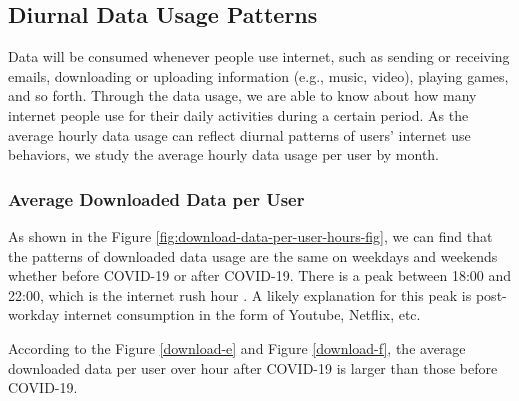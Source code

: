 \subsection{Diurnal Data Usage Patterns}
Data will be consumed whenever people use internet, such as sending or receiving emails, downloading or uploading information (e.g., music, video), playing games, and so forth.
Through the data usage, we are able to know about how many internet people use for their daily activities during a certain period. As the average hourly data usage can reflect diurnal patterns of users’ internet use behaviors, we study the average hourly data usage per user by month. 


\subsubsection{Average Downloaded Data per User}
\label{sec:download-data-per-user-over-hours}


As shown in the Figure \ref{fig:download-data-per-user-hours-fig}, we can find that the patterns of downloaded data usage are the same on weekdays and weekends whether before COVID-19 or after COVID-19. There is a peak between 18:00 and 22:00, which is the internet rush hour \cite{internetrushhour}. A likely explanation for this peak is post-workday internet consumption in the form of Youtube, Netflix, etc. 

According to the Figure \ref{download-e} and Figure \ref{download-f}, the average downloaded data per user over hour after COVID-19 is larger than those before COVID-19. 

